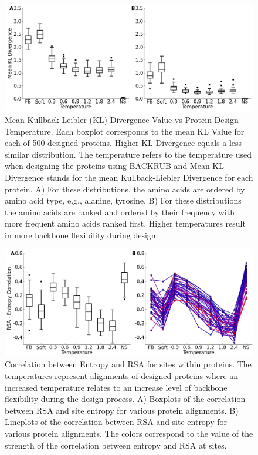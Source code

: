 \documentclass[12pt]{article}
\begin{document}
\begin{figure}[H]
\centerline{\includegraphics[width = 6in]{figures/Mean_KL_vs_Temp_Boxplot_Noah.png}}
\caption{Mean Kullback-Leibler (KL) Divergence Value vs Protein Design Temperature. Each boxplot corresponds to the mean KL Value for each of 500 designed proteins. Higher KL Divergence  equals a less similar distribution. The temperature refers to the temperature used when designing the proteins using BACKRUB and Mean KL Divergence stands for the mean Kullback-Liebler Divergence for each protein.  A) For these distributions, the amino acids are ordered by amino acid type, e.g., alanine, tyrosine. B) For these distributions the amino acids are ranked and ordered by their frequency with more frequent amino acids ranked first. Higher temperatures result in more backbone flexibility during design.}
\label{NoahAADisFig1}
\end{figure}

\begin{figure}[H]
\centering
\centerline{\includegraphics[width = 6in]{figures/Cor_Mean_Entropy_RSA_Combination_Plot_Noah.png}}
\caption{Correlation between Entropy and RSA for sites within proteins.  The temperatures represent alignments of designed proteins where an increased temperature relates to an increase level of backbone flexibility during the design process. A) Boxplots of the correlation between RSA and site entropy for various protein alignments. B) Lineplots of the correlation between RSA and site entropy for various protein alignments. The colors correspond to the value of the strength of the correlation between entropy and RSA at sites. }
\label{NoahStructureFig1}
\end{figure}
\end{document}
